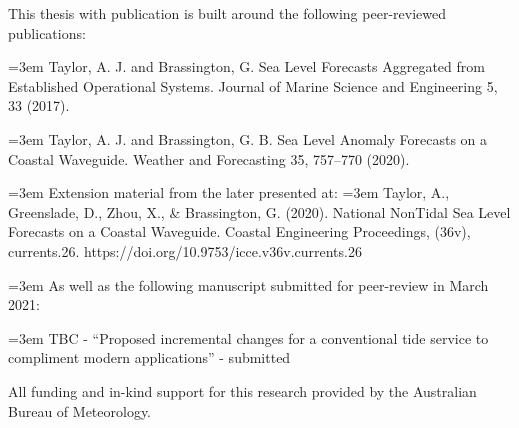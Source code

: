 
\begin{preface}

This thesis with publication is built around the following peer-reviewed publications:

\vspace{5mm}
\hangindent=3em
Taylor, A. J. and Brassington, G. Sea Level Forecasts Aggregated from Established Operational Systems. Journal of Marine Science and Engineering 5, 33 (2017).



\vspace{5mm}
\hangindent=3em
Taylor, A. J. and Brassington, G. B. Sea Level Anomaly Forecasts on a Coastal Waveguide. Weather and Forecasting 35, 757–770 (2020).

\vspace{5mm}
\hangindent=3em
Extension material from the later presented at:
\vspace{5mm}
\hangindent=3em
Taylor, A., Greenslade, D., Zhou, X., & Brassington, G. (2020). National NonTidal Sea Level Forecasts on a Coastal Waveguide. Coastal Engineering Proceedings, (36v), currents.26. https://doi.org/10.9753/icce.v36v.currents.26

\vspace{5mm}
\hangindent=3em
As well as the following manuscript submitted for peer-review in March 2021:

\vspace{5mm}
\hangindent=3em
TBC - ``Proposed incremental changes for a conventional tide service to compliment modern applications''  - submitted


\vspace{5mm}
\noindent  All funding and in-kind support for this research provided by the Australian Bureau of Meteorology. 

\end{preface}

